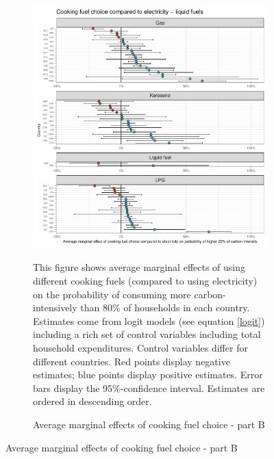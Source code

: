  \begin{figure}[ht!]\ContinuedFloat
   \centering
   \begin{subfigure}[b]{\textwidth}
   \centering
   \includegraphics{1_Figures/Analysis_Logit_Models_Marginal_Effects/Average_Marginal_Effects_affected_upper_80_CF_Electricity B_2017B.pdf}
   \caption{Average marginal effects of cooking fuel choice - part B} \label{fig:Logit_ME_CF_2}
   \begin{subcaption2}
     This figure shows average marginal effects of using different cooking fuels (compared to using electricity) on the probability of consuming more carbon-intensively than 80\% of households in each country. Estimates come from logit models (see equation \ref{logit}) including a rich set of control variables including total household expenditures. Control variables differ for different countries. Red points display negative estimates; blue points display positive estimates. Error bars display the 95\%-confidence interval. Estimates are ordered in descending order.
   \end{subcaption2}
   \end{subfigure}
 \end{figure}
 \clearpage

